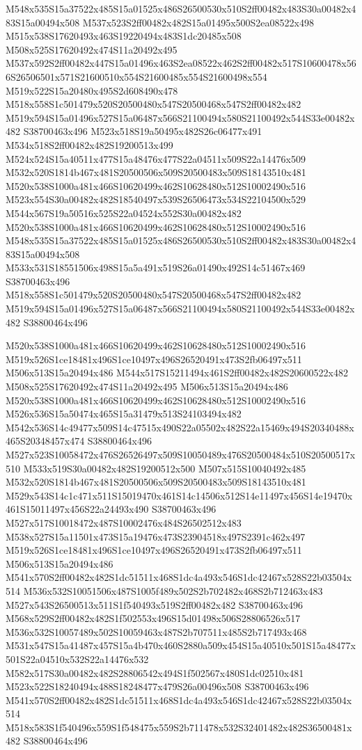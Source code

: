 \documentclass{article}
\begin{document}
\begin{multicols}{2}
M548x535S15a37522x485S15a01525x486S26500530x510S2ff00482x483S30a00482x483S15a00494x508 M537x523S2ff00482x482S15a01495x500S2ea08522x498 M515x538S17620493x463S19220494x483S1dc20485x508 M508x525S17620492x474S11a20492x495 M537x592S2ff00482x447S15a01496x463S2ea08522x462S2ff00482x517S10600478x566S26506501x571S21600510x554S21600485x554S21600498x554 M519x522S15a20480x495S2d608490x478 M518x558S1c501479x520S20500480x547S20500468x547S2ff00482x482 M519x594S15a01496x527S15a06487x566S21100494x580S21100492x544S33e00482x482 S38700463x496 M523x518S19a50495x482S26c06477x491 M534x518S2ff00482x482S19200513x499 M524x524S15a40511x477S15a48476x477S22a04511x509S22a14476x509 M532x520S1814b467x481S20500506x509S20500483x509S18143510x481 M520x538S1000a481x466S10620499x462S10628480x512S10002490x516 M523x554S30a00482x482S18540497x539S26506473x534S22104500x529 M544x567S19a50516x525S22a04524x552S30a00482x482 M520x538S1000a481x466S10620499x462S10628480x512S10002490x516 M548x535S15a37522x485S15a01525x486S26500530x510S2ff00482x483S30a00482x483S15a00494x508 M533x531S18551506x498S15a5a491x519S26a01490x492S14c51467x469 S38700463x496 M518x558S1c501479x520S20500480x547S20500468x547S2ff00482x482 M519x594S15a01496x527S15a06487x566S21100494x580S21100492x544S33e00482x482 S38800464x496

M520x538S1000a481x466S10620499x462S10628480x512S10002490x516 M519x526S1ce18481x496S1ce10497x496S26520491x473S2fb06497x511 M506x513S15a20494x486 M544x517S15211494x461S2ff00482x482S20600522x482 M508x525S17620492x474S11a20492x495 M506x513S15a20494x486 M520x538S1000a481x466S10620499x462S10628480x512S10002490x516 M526x536S15a50474x465S15a31479x513S24103494x482 M542x536S14c49477x509S14c47515x490S22a05502x482S22a15469x494S20340488x465S20348457x474 S38800464x496 M527x523S10058472x476S26526497x509S10050489x476S20500484x510S20500517x510 M533x519S30a00482x482S19200512x500 M507x515S10040492x485 M532x520S1814b467x481S20500506x509S20500483x509S18143510x481 M529x543S14c1c471x511S15019470x461S14c14506x512S14e11497x456S14e19470x461S15011497x456S22a24493x490 S38700463x496 M527x517S10018472x487S10002476x484S26502512x483 M538x527S15a11501x473S15a19476x473S23904518x497S2391c462x497 M519x526S1ce18481x496S1ce10497x496S26520491x473S2fb06497x511 M506x513S15a20494x486 M541x570S2ff00482x482S1dc51511x468S1dc4a493x546S1dc42467x528S22b03504x514 M536x532S10051506x487S1005f489x502S2b702482x468S2b712463x483 M527x543S26500513x511S1f540493x519S2ff00482x482 S38700463x496 M568x529S2ff00482x482S1f502553x496S15d01498x506S28806526x517 M536x532S10057489x502S10059463x487S2b707511x485S2b717493x468 M531x547S15a41487x457S15a4b470x460S2880a509x454S15a40510x501S15a48477x501S22a04510x532S22a14476x532 M582x517S30a00482x482S28806542x494S1f502567x480S1dc02510x481 M523x522S18240494x488S18248477x479S26a00496x508 S38700463x496 M541x570S2ff00482x482S1dc51511x468S1dc4a493x546S1dc42467x528S22b03504x514 M518x583S1f540496x559S1f548475x559S2b711478x532S32401482x482S36500481x482 S38800464x496


\end{multicols}
\end{document}
